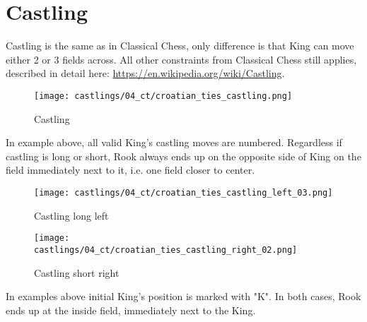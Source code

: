\clearpage %

\section*{Castling}
\label{sec:Croatian Ties/Castling}

\vspace*{-0.3\baselineskip}
Castling is the same as in Classical Chess, only difference is that King can move either 2 or 3
fields across. All other constraints from Classical Chess still applies, described in detail here:
\href{https://en.wikipedia.org/wiki/Castling}{https://en.wikipedia.org/wiki/Castling}.

\vspace*{-0.3\baselineskip}
\noindent
\begin{figure}[!h]
\texttt{[image: castlings/04\_ct/croatian\_ties\_castling.png]}
\vspace*{-1.4\baselineskip}
\caption{Castling}
\label{fig:croatian_ties_castling}
\end{figure}

\vspace*{-0.3\baselineskip}
In example above, all valid King's castling moves are numbered. Regardless if castling is long or short,
Rook always ends up on the opposite side of King on the field immediately next to it, i.e. one field closer
to center.

\vspace*{-0.3\baselineskip}
\noindent
\begin{figure}[!h]
\texttt{[image: castlings/04\_ct/croatian\_ties\_castling\_left\_03.png]}
\vspace*{-1.4\baselineskip}
\caption{Castling long left}
\label{fig:croatian_ties_castling_left_03}
\end{figure}

\vspace*{-0.7\baselineskip}
\noindent
\begin{figure}[!h]
\texttt{[image: castlings/04\_ct/croatian\_ties\_castling\_right\_02.png]}
\vspace*{-1.4\baselineskip}
\caption{Castling short right}
\label{fig:croatian_ties_castling_right_02}
\end{figure}

\vspace*{-0.3\baselineskip}
In examples above initial King's position is marked with "K". In both cases, Rook ends up at the
inside field, immediately next to the King.

